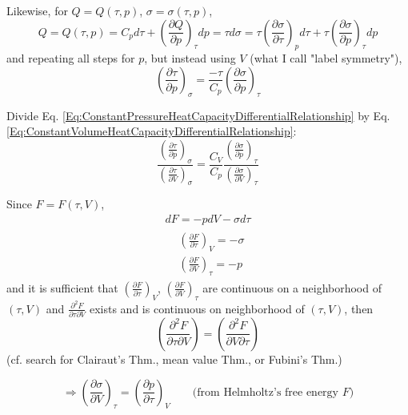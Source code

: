 \documentclass[twoside,landscape,10pt]{amsart}
\theoremstyle{plain}
\theoremstyle{definition}
\theoremstyle{remark}
\theoremstyle{remark}
\begin{document}
\begin{multicols*}{2}
Likewise, for $Q= Q(\tau, p)$, $\sigma = \sigma(\tau, p)$, 
\[
Q = Q(\tau, p) = C_p d\tau + \left( \frac{\partial Q}{\partial p } \right)_{\tau} dp = \tau d\sigma = \tau \left( \frac{\partial \sigma}{\partial \tau} \right)_p d\tau + \tau \left( \frac{\partial \sigma}{ \partial p} \right)_{\tau} dp
\]
and repeating all steps for $p$, but instead using $V$ (what I call "label symmetry"), 
\begin{equation}\label{Eq:ConstantPressureHeatCapacityDifferentialRelationship}
\left( \frac{\partial \tau}{\partial p } \right)_{\sigma} = \frac{-\tau}{C_p} \left( \frac{\partial \sigma}{\partial p} \right)_{\tau}
\end{equation}

Divide Eq. \ref{Eq:ConstantPressureHeatCapacityDifferentialRelationship} by Eq. \ref{Eq:ConstantVolumeHeatCapacityDifferentialRelationship}:
\begin{equation}\label{Eq:ConstantPressureHeatCapacityRelationshipOverConstantVolume}
\frac{ \left( \frac{\partial \tau}{\partial p}\right)_{\sigma} }{ \left( \frac{\partial \tau}{\partial V}\right)_{\sigma} } = \frac{C_V}{C_p} \frac{ \left( \frac{\partial \sigma}{\partial p}\right)_{\tau} }{ \left( \frac{\partial \sigma}{\partial V}\right)_{\tau} }
\end{equation} 

Since $F= F(\tau, V)$, 
\[
\begin{gathered}
dF = -pdV - \sigma d\tau \\
\begin{aligned}
& \left(\frac{\partial F}{\partial \tau} \right)_V = -\sigma \\ 
& \left(\frac{\partial F}{\partial V} \right)_{\tau} = - p 
\end{aligned}
\end{gathered}
\]
and it is sufficient that $\left(\frac{\partial F}{\partial \tau} \right)_V$, $\left(\frac{\partial F}{\partial V} \right)_{\tau}$ are continuous on a neighborhood of $(\tau, V)$ and $\frac{\partial^2 F}{ \partial \tau \partial V}$ exists and is continuous on neighborhood of $(\tau, V)$, then
\[
\left(\frac{\partial^2 F}{\partial \tau \partial V} \right) = \left(\frac{\partial^2 F}{\partial V \partial \tau} \right)
\]
(cf. search for Clairaut's Thm., mean value Thm., or Fubini's Thm.)

\begin{equation}\label{Eq:2ndOrderPartialDerivativeHelmholtzRelationship}
\Longrightarrow \left( \frac{ \partial \sigma}{ \partial V} \right)_{\tau} = \left(\frac{\partial p}{\partial \tau } \right)_V \qquad \text{(from Helmholtz's free energy $F$)}
\end{equation}


\end{multicols*}
\end{document}
